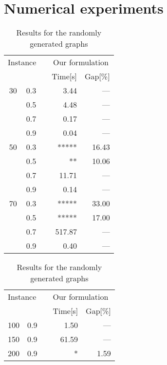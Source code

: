\documentclass[11pt,a4paper]{article}
\begin{document}
\section{Numerical experiments}\label{sec:CompRes}


\begin{table}[tb]
\caption{Results for the randomly generated graphs\label{tbl:smallRand}}
\begin{center}
{\small
\begin{tabular}{rrrrr}														
\toprule
\multicolumn{2}{l}{Instance}			&&	\multicolumn{2}{c}{Our formulation}\\ \cline{1-2} \cline{4-5}
\multicolumn{1}{c}{}&\multicolumn{1}{c}{}&&\multicolumn{1}{l}{Time[s]}&\multicolumn{1}{l}{Gap[\%]}\\
\midrule										
30	&	0.3	&&	3.44		&	---\\	
	&	0.5	&&	4.48		&	---\\
	&	0.7	&&	0.17		&	---\\	
	&	0.9	&&	0.04		&	---\\
\midrule
50	&	0.3	&&	*****	&	16.43	\\	
	&	0.5	&&	**		&	10.06\\
	&	0.7	&&	11.71		&	---\\	
	&	0.9	&&	0.14		&	---\\
\midrule														
70	&	0.3	&&	*****	&	33.00\\	
	&	0.5	&&	*****	&	17.00	\\
	&	0.7	&&	517.87	&	---\\	
	&	0.9	&&	0.40		&	---\\
\bottomrule
\end{tabular}	
}
\end{center}
\end{table}
\begin{table}[tb]
\caption{Results for the randomly generated graphs \label{tbl:middleRand}}
\begin{center}
{\small
\begin{tabular}{rrrrr}														
\toprule
\multicolumn{2}{l}{Instance}			&&	\multicolumn{2}{l}{Our formulation}\\ \cline{1-2} \cline{4-5}
\multicolumn{1}{c}{}	&	\multicolumn{1}{c}{}	&&	\multicolumn{1}{l}{Time[s]}	&	\multicolumn{1}{l}{Gap[\%]}	\\
\midrule										
100	&	0.9	&&	1.50		&	---\\	
150	&	0.9	&&	61.59	&	---\\								
200	&	0.9	&&	*		&	1.59\\	
\bottomrule
\end{tabular}	
}													
\end{center}
\end{table}
\end{document}
